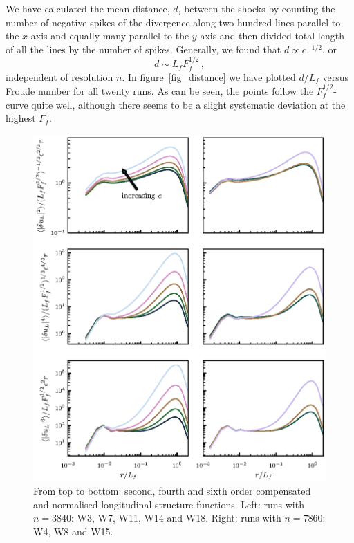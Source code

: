 We have calculated  the mean distance, $ d $, between the shocks by counting the number of negative spikes
of the divergence along two hundred lines parallel to the $ x $-axis and equally many 
parallel to the $ y $-axis and then divided total length of all the lines by
the number of spikes. Generally, we found that $ d \propto c^{-1/2} $, or
\begin{equation} \label{MeanDistance}
d \sim L_f F_f ^{1/2} \, ,
\end{equation}
independent of resolution $ n $. In figure~\ref{fig_distance} we have plotted
$ d/L_f $ versus Froude number for all twenty runs. As can be seen, the points
follow the $ F_f^{1/2} $-curve quite well, although there seems to be a slight
systematic deviation at the highest $ F_f $.

\begin{figure}[htp!]
\centerline{
\includegraphics[]{paper_04_shallow_water/Pyfig/fig7}}
\caption{From top to bottom: second, fourth and sixth order compensated and
normalised longitudinal structure functions. Left: runs with $ n=3840 $: W3,
W7, W11, W14 and W18. Right: runs with $ n = 7860 $: W4, W8 and W15. }
\label{fig_StrucFunc}
\end{figure}

